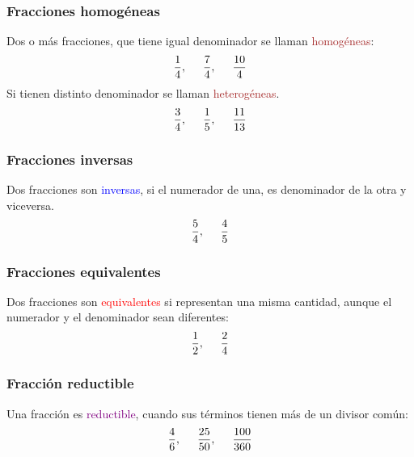 \begin{frame}
\frametitle{Fracciones homogéneas}
Dos o más fracciones, que tiene igual denominador se llaman \textcolor{brown}{homogéneas}:
\begin{align*}
\dfrac{1}{4}, \hspace{0.5cm} \dfrac{7}{4}, \hspace{0.5cm} \dfrac{10}{4}
\end{align*}
\pause
Si tienen distinto denominador se llaman \textcolor{brown}{heterogéneas}.
\begin{align*}
\dfrac{3}{4}, \hspace{0.5cm} \dfrac{1}{5}, \hspace{0.5cm} \dfrac{11}{13}
\end{align*}
\end{frame}
\begin{frame}
\frametitle{Fracciones inversas}
Dos fracciones son \textcolor{blue}{inversas}, si el numerador de una, es denominador de la otra y viceversa.
\begin{align*}
\dfrac{5}{4}, \hspace{0.5cm} \dfrac{4}{5}
\end{align*}
\end{frame}
\begin{frame}
\frametitle{Fracciones equivalentes}
Dos fracciones son \textcolor{red}{equivalentes} si representan una misma cantidad, aunque el numerador y el denominador sean diferentes:
\begin{align*}
\dfrac{1}{2}, \hspace{0.5cm} \dfrac{2}{4}
\end{align*}
\end{frame}
\begin{frame}
\frametitle{Fracción reductible}
Una fracción es \textcolor{purple}{reductible}, cuando sus términos tienen más de un divisor común:
\begin{align*}
\dfrac{4}{6}, \hspace{0.5cm} \dfrac{25}{50}, \hspace{0.5cm} \dfrac{100}{360}
\end{align*}
\end{frame}
